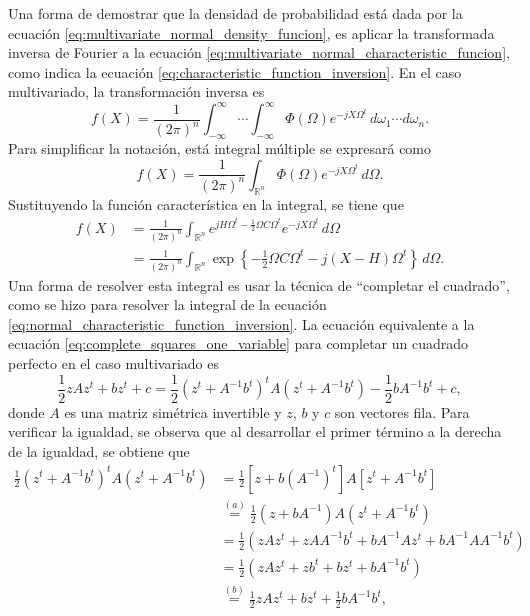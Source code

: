 \documentclass[a4paper]{report}
\begin{document}
Una forma de demostrar que la densidad de probabilidad está dada por la ecuación \ref{eq:multivariate_normal_density_funcion}, es aplicar la transformada inversa de Fourier a la ecuación \ref{eq:multivariate_normal_characteristic_funcion}, como indica la ecuación \ref{eq:characteristic_function_inversion}. En el caso multivariado, la transformación inversa es
\[
 f(X)=\frac{1}{(2\pi)^n}\int_{-\infty}^{\infty}\cdots\int_{-\infty}^{\infty}\Phi(\Omega)e^{-jX\Omega^t}\,d\omega_1\cdots d\omega_n.
\]
Para simplificar la notación, está integral múltiple se expresará como
\[
 f(X)=\frac{1}{(2\pi)^n}\int_{{\mathbb{R}^n}}\Phi(\Omega)e^{-jX\Omega^t}\,d\Omega.
\]
Sustituyendo la función característica en la integral, se tiene que
\begin{align}\label{eq:multivariate_normal_density_funcion_tmp1}
 f(X)&=\frac{1}{(2\pi)^n}\int_{{\mathbb{R}^n}}e^{jH\Omega ^t-\frac{1}{2}\Omega C\Omega^t}e^{-jX\Omega^t}\,d\Omega\nonumber\\
  &=\frac{1}{(2\pi)^n}\int_{{\mathbb{R}^n}}\exp\left\{-\frac{1}{2}\Omega C\Omega^t-j(X-H)\Omega^t\right\}\,d\Omega.
\end{align}
Una forma de resolver esta integral es usar la técnica de ``completar el cuadrado'', como se hizo para resolver la integral de la ecuación \ref{eq:normal_characteristic_function_inversion}. La ecuación equivalente a la ecuación \ref{eq:complete_squares_one_variable} para completar un cuadrado perfecto en el caso multivariado es \cite{do2008more}
\begin{equation}\label{eq:complete_squares_multivariate}
 \frac{1}{2}zAz^t+bz^t+c=\frac{1}{2}\left(z^t+A^{-1}b^t\right)^tA\left(z^t+A^{-1}b^t\right)-\frac{1}{2}bA^{-1}b^t+c,
\end{equation}
donde \(A\) es una matriz simétrica invertible y \(z\), \(b\) y \(c\) son vectores fila. Para verificar la igualdad, se observa que al desarrollar el primer término a la derecha de la igualdad, se obtiene que
\small
\begin{align*}
 \frac{1}{2}\left(z^t+A^{-1}b^t\right)^tA\left(z^t+A^{-1}b^t\right)&=
      \frac{1}{2}\left[z+b\left(A^{-1}\right)^t\right]A\left[z^t+A^{-1}b^t\right]\\
  &\overset{(a)}{=}\frac{1}{2}\left(z+bA^{-1}\right)A\left(z^t+A^{-1}b^t\right)\\
  &=\frac{1}{2}\left(zAz^t+zAA^{-1}b^t+bA^{-1}Az^t+bA^{-1}AA^{-1}b^t\right)\\
  &=\frac{1}{2}\left(zAz^t+zb^t+bz^t+bA^{-1}b^t\right)\\
  &\overset{(b)}{=}\frac{1}{2}zAz^t+bz^t+\frac{1}{2}bA^{-1}b^t,
\end{align*}
\end{document}
